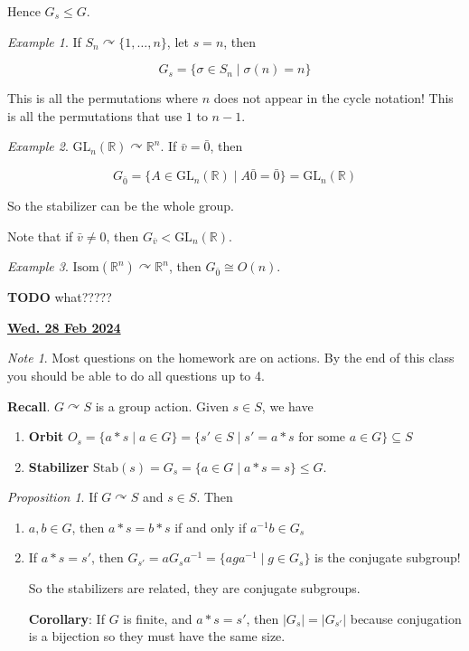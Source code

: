 \documentclass[12pt]{article}
\renewcommand{\date}[1]{\underline{\bf #1}}
\def\Stab{\text{Stab}}
\def\Isom{\text{Isom}}
\def\acts{\curvearrowright} %
\def\gl{\text{GL}}
\def\R{{\mathbb R}}
\def\TODO{\color{red}\textbf{TODO}\color{black}}
\theoremstyle{remark}
\newtheorem{proposition}{Proposition}
\theoremstyle{remark}
\theoremstyle{remark}
\newtheorem{example}{Example}
\theoremstyle{remark}
\theoremstyle{remark}
\newtheorem*{note}{Note}
\begin{document}
Hence $G_s \le G$.

\begin{example}
  If $S_n \acts \{1, \dots, n\}$, let $s = n$, then

  \[
    G_s = \{\sigma \in S_n \mid \sigma(n) = n\}
  \]

  This is all the permutations where $n$ does not appear in the cycle notation!
  This is all the permutations that use $1$ to $n - 1$.
\end{example}

\begin{example}
  $\gl_n(\R) \acts \R^n$. If $\bar v = \bar 0$, then

  \[
    G_{\bar 0} = \{A \in \gl_n(\R) \mid A \bar 0 = \bar 0\} = \gl_n(\R)
  \]

  So the stabilizer can be the whole group.

  Note that if $\bar v \ne 0$, then $G_{\bar v} < \gl_n(\R)$.
\end{example}

\begin{example}
  $\Isom(\R^n) \acts \R^n$, then $G_{\bar 0} \cong O(n)$.

  \TODO{} what?????
\end{example}

\date{Wed. 28 Feb 2024}

\begin{note}
  Most questions on the homework are on actions. By the end of this class you
  should be able to do all questions up to 4.
\end{note}

{\bf Recall}. $G \acts S$ is a group action. Given $s \in S$, we have

\begin{enumerate}
  \item {\bf Orbit} $O_s = \{a * s \mid a \in G\} = \{s' \in S \mid s' = a * s\text{ for some } a \in G\} \subseteq S$
  \item {\bf Stabilizer} $\Stab(s) = G_s = \{a \in G \mid a * s = s \} \le G$.
\end{enumerate}

\begin{proposition}
  If $G \acts S$ and $s \in S$. Then

  \begin{enumerate}
    \item $a, b \in G$, then $a * s = b * s$ if and only if $a^{-1} b \in G_s$
    \item If $a * s = s'$, then $G_{s'} = a G_{s} a^{-1} = \{aga^{-1} \mid g \in
      G_s\}$ is the conjugate subgroup!

      So the stabilizers are related, they are conjugate subgroups.

      {\bf Corollary}: If $G$ is finite, and $a * s = s'$, then $|G_s| = |G_{s'}|$
      because conjugation is a bijection so they must have the same size.
  \end{enumerate}
\end{proposition}
\end{document}

